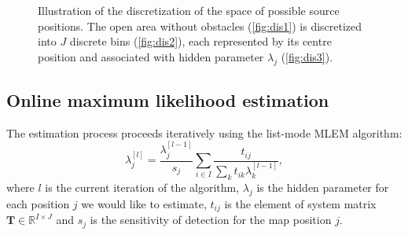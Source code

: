 \begin{figure}[!h]
  \centering

  \caption{Illustration of the discretization of the space of possible source positions. The open area without obstacles (\ref{fig:dis1}) is discretized into $J$ discrete bins (\ref{fig:dis2}), each represented by its centre position and associated with hidden parameter $\lambda_{j}$ (\ref{fig:dis3}).}
  \label{fig:discretization}
\end{figure}%

\subsection{Online maximum likelihood estimation}%
The estimation process proceeds iteratively using the list-mode \ac{MLEM} algorithm:
\begin{equation}
  \lambda_{j}^{[l]} = \frac{\lambda_{j}^{[l-1]}}{s_{j}} \sum_{i \in I} \frac{t_{ij}}{\sum_{k} t_{ik} \lambda_{k}^{[l-1]}},
  \label{eq:MLEM}
\end{equation}
where $l$ is the current iteration of the algorithm, $\lambda_{j}$ is the hidden parameter for each position $j$ we would like to estimate, $t_{ij}$ is the element of system matrix $\mathbf{T}\in \mathbb{R}^{I \times J}$ and $s_{j}$ is the sensitivity of detection for the map position $j$.

